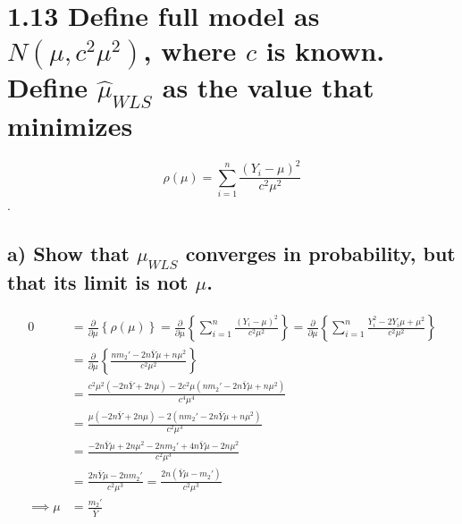 \documentclass[
  letterpaper,
  DIV=11,
  numbers=noendperiod]{scrreprt}
\begin{document}
\newpage

\hypertarget{define-full-model-as-nmu-c2mu2-where-c-is-known.-define-hatmu_wls-as-the-value-that-minimizes}{%
\section{\texorpdfstring{1.13 Define full model as \(N(\mu, c^2\mu^2)\),
where \(c\) is known. Define \(\hat{\mu}_{WLS}\) as the value that
minimizes}{1.13 Define full model as N(\textbackslash mu, c\^{}2\textbackslash mu\^{}2), where c is known. Define \textbackslash hat\{\textbackslash mu\}\_\{WLS\} as the value that minimizes}}\label{define-full-model-as-nmu-c2mu2-where-c-is-known.-define-hatmu_wls-as-the-value-that-minimizes}}

\[\rho(\mu) = \sum_{i=1}^n \frac{(Y_i- \mu)^2}{c^2\mu^2}\].

\hypertarget{a-show-that-mu_wls-converges-in-probability-but-that-its-limit-is-not-mu.}{%
\subsection{\texorpdfstring{a) Show that \(\mu_{WLS}\) converges in
probability, but that its limit is not
\(\mu\).}{a) Show that \textbackslash mu\_\{WLS\} converges in probability, but that its limit is not \textbackslash mu.}}\label{a-show-that-mu_wls-converges-in-probability-but-that-its-limit-is-not-mu.}}

\[
\begin{aligned}
0 &= \frac{\partial}{\partial \mu} \left\{\rho(\mu)\right\} 
= \frac{\partial }{\partial \mu} \left\{ \sum_{i=1}^n \frac{(Y_i- \mu)^2}{c^2\mu^2} \right\} = \frac{\partial }{\partial \mu} \left\{ \sum_{i=1}^n \frac{Y_i^2- 2Y_i\mu +\mu^2}{c^2\mu^2} \right\} \\
&= \frac{\partial }{\partial \mu} \left\{ \frac{nm_2'- 2n\bar{Y}\mu +n\mu^2}{c^2\mu^2} \right\} \\
&=\frac{c^2\mu^2(-2n\bar{Y}+2n\mu)-2c^2\mu(nm_2'- 2n\bar{Y}\mu +n\mu^2)}{c^4\mu^4} \\
&=\frac{\mu(-2n\bar{Y}+2n\mu)-2(nm_2'- 2n\bar{Y}\mu +n\mu^2)}{c^2\mu^3} \\
&=\frac{-2n\bar{Y}\mu+2n\mu^2-2nm_2'+ 4n\bar{Y}\mu -2n\mu^2}{c^2\mu^3} \\
&=\frac{2n\bar{Y}\mu -2nm_2'}{c^2\mu^3} = \frac{2n(\bar{Y}\mu -m_2')}{c^2\mu^3}\\
\implies \mu &= \frac{m_2'}{\bar{Y}}
\end{aligned}
\]
\end{document}
